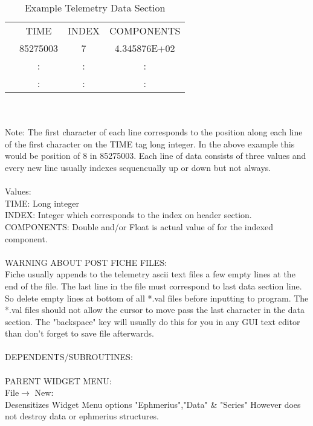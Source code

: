 \begin{table}
\begin{center}
\caption{Example Telemetry Data Section}
\begin{tabular}{lccc}
&TIME   &INDEX    &COMPONENTS\\
&85275003  &7   &4.345876E+02\\
&:	   &:		&:\\
&:	   &:		&:\\
\end{tabular}  
\end{center}
\end{table}\\

\\
\noindent Note: The first character of each line corresponds to the position along each line of the first character on the TIME tag long integer. In the above example this would be position of 8 in 85275003. Each line of data consists of three values and every new line usually indexes sequencually up or down but not always.\\

\\
\noindent Values:\\
TIME: Long integer\\
INDEX: Integer which corresponds to the index on header section.\\
COMPONENTS: Double and/or Float is actual value of for the indexed component.\\

\\
\noindent WARNING ABOUT POST FICHE FILES:\\
		  Fiche usually appends to the telemetry ascii text files a few
		  empty lines at the end of the file. The last line in the file
		  must correspond to last data section line. So delete empty lines
		  at bottom of all *.val files before inputting to program. The
		  *.val files should not allow the cursor to move pass the last
		  character in the data section. The "backspace" key will usually
		  do this for you in any GUI text editor than don't forget to save
		  file afterwards.\\


\\
\noindent DEPENDENTS/SUBROUTINES:\\

\\
			PARENT WIDGET MENU:\\
					File$\rightarrow$ New:\\
					Desensitizes Widget Menu options "Ephmerius","Data" & "Series"
					However does not destroy data or ephmerius structures.\\
\\

